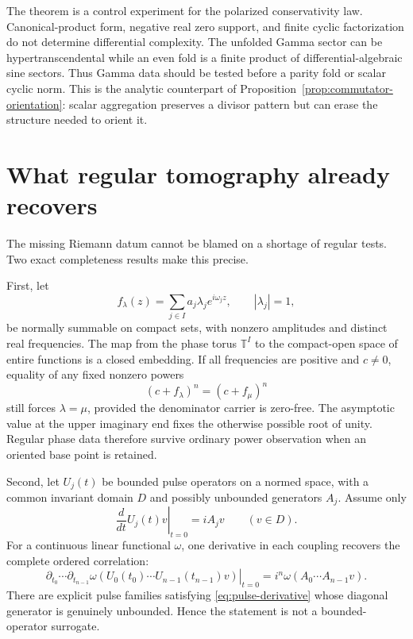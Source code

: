 \documentclass[11pt]{article}
\theoremstyle{definition}
\theoremstyle{remark}
\begin{document}
The theorem is a control experiment for the polarized conservativity law.
Canonical-product form, negative real zero support, and finite cyclic
factorization do not determine differential complexity.  The unfolded
Gamma sector can be hypertranscendental while an even fold is a finite
product of differential-algebraic sine sectors.  Thus Gamma data should be
tested before a parity fold or scalar cyclic norm.  This is the analytic
counterpart of Proposition~\ref{prop:commutator-orientation}: scalar
aggregation preserves a divisor pattern but can erase the structure needed
to orient it.

\section{What regular tomography already recovers}
\label{sec:regular}

The missing Riemann datum cannot be blamed on a shortage of regular tests.
Two exact completeness results make this precise.

First, let
\[
 f_\lambda(z)=\sum_{j\in I}a_j\lambda_j e^{i\omega_jz},
 \qquad |\lambda_j|=1,
\tag{8.1}\label{eq:bohr-carrier}
\]
be normally summable on compact sets, with nonzero amplitudes and distinct
real frequencies.  The map from the phase torus \(\mathbb T^I\) to the
compact-open space of entire functions is a closed embedding.  If all
frequencies are positive and \(c\ne0\), equality of any fixed nonzero powers
\[
                    (c+f_\lambda)^n=(c+f_\mu)^n
\]
still forces \(\lambda=\mu\), provided the denominator carrier is
zero-free.  The asymptotic value at the upper imaginary end fixes the
otherwise possible root of unity.  Regular phase data therefore survive
ordinary power observation when an oriented base point is retained.

Second, let \(U_j(t)\) be bounded pulse operators on a normed space, with a
common invariant domain \(D\) and possibly unbounded generators \(A_j\).
Assume only
\[
 \left.\frac d{dt}U_j(t)v\right|_{t=0}=iA_jv
 \qquad(v\in D).
\tag{8.2}\label{eq:pulse-derivative}
\]
For a continuous linear functional \(\omega\), one derivative in each
coupling recovers the complete ordered correlation:
\[
 \left.\partial_{t_0}\cdots\partial_{t_{n-1}}
   \omega\!\left(U_0(t_0)\cdots U_{n-1}(t_{n-1})v\right)
 \right|_{t=0}
   =i^n\omega(A_0\cdots A_{n-1}v).
\tag{8.3}\label{eq:ordered-tomography}
\]
There are explicit pulse families satisfying
\eqref{eq:pulse-derivative} whose diagonal generator is genuinely
unbounded.  Hence the statement is not a bounded-operator surrogate.
\end{document}
